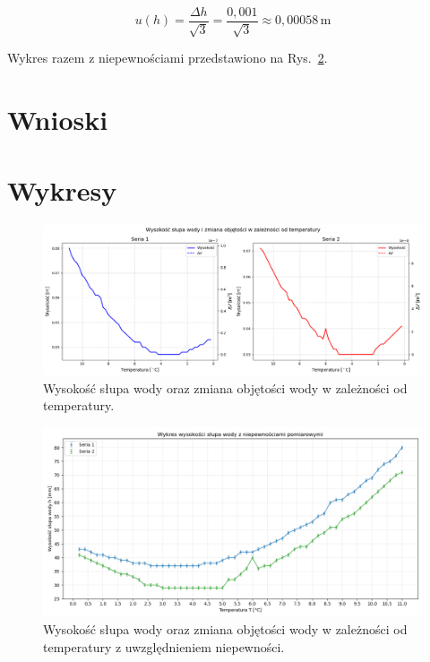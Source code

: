 \documentclass[a4paper,12pt]{article}
\begin{document}
\begin{equation}
    u(h) = \frac{\Delta h}{\sqrt{3}} = \frac{0{,}001}{\sqrt{3}} \approx 0{,}00058\,\text{m}
\end{equation}

Wykres razem z niepewnościami przedstawiono na Rys.~\ref{fig:height_vs_temperature_with_uncertainties}.

\section{Wnioski}

\newpage
\section{Wykresy}

\begin{figure}[H]
    \centering
    \includegraphics[width=0.9\textheight,angle=90]{height_vs_temperature.png}
    \caption{Wysokość słupa wody oraz zmiana objętości wody w zależności od temperatury.}
    \label{fig:height_vs_temperature}
\end{figure}

\begin{figure}[H]
    \centering
    \includegraphics[width=0.9\textheight,angle=90]{height_vs_temperature_uncertainties.png}
    \caption{Wysokość słupa wody oraz zmiana objętości wody w zależności od temperatury z uwzględnieniem niepewności.}
    \label{fig:height_vs_temperature_with_uncertainties}
\end{figure}



\end{document}
